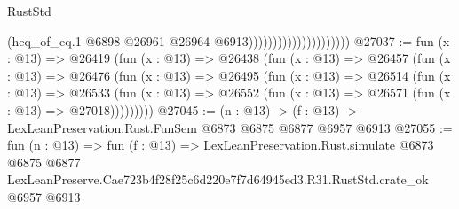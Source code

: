 \begin{lexlean}{RustStd}
\begin{coremodule}
                                            (heq_of_eq.{1}
                                              @6898
                                              @26961
                                              @26964
                                              @6913)))))))))))))))))))))
@27037 := fun (x : @13) =>
  @26419
    (fun (x : @13) =>
    @26438
      (fun (x : @13) =>
      @26457
        (fun (x : @13) =>
        @26476
          (fun (x : @13) =>
          @26495
            (fun (x : @13) =>
            @26514
              (fun (x : @13) =>
              @26533
                (fun (x : @13) => @26552 (fun (x : @13) => @26571 (fun (x : @13) => @27018)))))))))
@27045 := (n : @13) -> (f : @13) -> LexLeanPreservation.Rust.FunSem @6873 @6875 @6877 @6957 @6913
@27055 := fun (n : @13) =>
  fun (f : @13) =>
  LexLeanPreservation.Rust.simulate
    @6873
    @6875
    @6877
    LexLeanPreserve.Cae723b4f28f25c6d220e7f7d64945ed3.R31.RustStd.crate_ok
    @6957
    @6913
\end{coremodule}
\end{lexlean}
